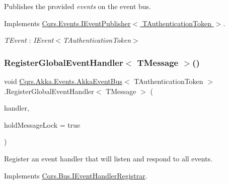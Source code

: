 Publishes the provided {\itshape events}  on the event bus. 



Implements \hyperlink{interfaceCqrs_1_1Events_1_1IEventPublisher_a2cbcc3d2c24d015abef6337714ec51ff_a2cbcc3d2c24d015abef6337714ec51ff}{Cqrs.\+Events.\+I\+Event\+Publisher$<$ T\+Authentication\+Token $>$}.

\begin{Desc}
\item[Type Constraints]\begin{description}
\item[{\em T\+Event} : {\em I\+Event$<$T\+Authentication\+Token$>$}]\end{description}
\end{Desc}
\mbox{\label{classCqrs_1_1Akka_1_1Events_1_1AkkaEventBus_ab0df68070fbc625cad5cd2e74667b01d_ab0df68070fbc625cad5cd2e74667b01d}} 
\subsubsection{\texorpdfstring{Register\+Global\+Event\+Handler$<$ T\+Message $>$()}{RegisterGlobalEventHandler< TMessage >()}}
{\footnotesize\ttfamily void \hyperlink{classCqrs_1_1Akka_1_1Events_1_1AkkaEventBus}{Cqrs.\+Akka.\+Events.\+Akka\+Event\+Bus}$<$ T\+Authentication\+Token $>$.Register\+Global\+Event\+Handler$<$ T\+Message $>$ (\begin{DoxyParamCaption}\item[{Action$<$ T\+Message $>$}]{handler,  }\item[{bool}]{hold\+Message\+Lock = {\ttfamily true} }\end{DoxyParamCaption})}



Register an event handler that will listen and respond to all events. 



Implements \hyperlink{interfaceCqrs_1_1Bus_1_1IEventHandlerRegistrar_a80854abefd17bc58bd94e45266cf141e_a80854abefd17bc58bd94e45266cf141e}{Cqrs.\+Bus.\+I\+Event\+Handler\+Registrar}.

